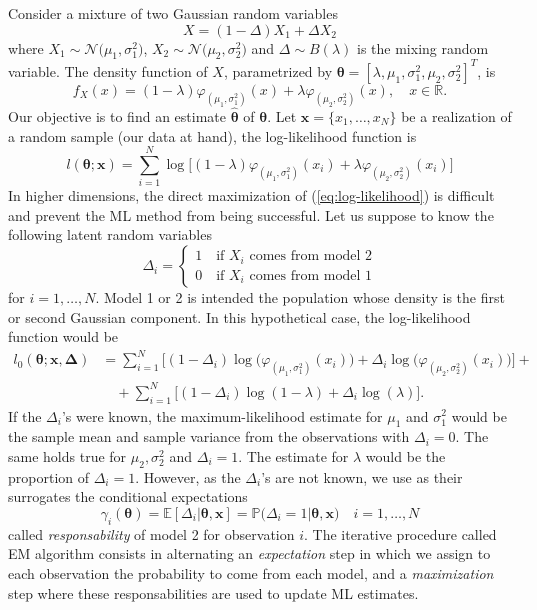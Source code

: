 Consider a mixture of two Gaussian random variables
\[X = (1-\Delta)X_1 + \Delta X_2 \] where $X_1 \sim \mathcal{N}\big(\mu_1,\sigma^2_1\big)$, $X_2 \sim \mathcal{N}\big(\mu_2,\sigma^2_2\big)$ and $\Delta \sim B(\lambda)$ is the mixing random variable. The density function of $X$, parametrized by $\bm{\theta} = [\lambda,\mu_1,\sigma^2_1,\mu_2,\sigma^2_2]^T$, is
\[f_X(x) = (1-\lambda)\varphi_{(\mu_1,\sigma^2_1)}(x)+\lambda \varphi_{(\mu_2,\sigma^2_2)}(x), \quad x \in \mathbb{R}. \] Our objective is to find an estimate $\widehat{\bm{\theta}}$ of $\bm{\theta}$. Let $\bm{x} = \{x_1,\ldots,x_N\}$ be a realization of a random sample (our data at hand), the log-likelihood function is
\begin{equation}\label{eq:log-likelihood}
l(\bm{\theta};\bm{x}) = \sum_{i=1}^{N}\log\big[(1-\lambda)\varphi_{(\mu_1,\sigma^2_1)}(x_i)+\lambda\varphi_{(\mu_2,\sigma^2_2)}(x_i) \big]
\end{equation}
In higher dimensions, the direct maximization of (\ref{eq:log-likelihood}) is difficult and prevent the ML method from being successful. Let us suppose to know the following latent random variables
\[ \Delta_i = 
\begin{cases*}
1 \quad  \text{if $X_i$ comes from model 2}\\
0 \quad \text{if $X_i$ comes from model 1}
\end{cases*}
\]
for $i = 1,\ldots,N$. Model 1 or 2 is intended the population whose density is the first or second Gaussian component. In this hypothetical case, the log-likelihood function would be 
\begin{align*}
l_0(\bm{\theta};\bm{x},\bm{\Delta}) & = \sum_{i=1}^{N}\big[(1-\Delta_i)\log\big(\varphi_{(\mu_1,\sigma^2_1)}(x_i)\big)+\Delta_i\log\big(\varphi_{(\mu_2,\sigma^2_2)}(x_i)\big)\big]+\\
& \quad + \sum_{i=1}^{N}\big[(1-\Delta_i)\log(1-\lambda)+\Delta_i \log(\lambda) \big].
\end{align*}
If the $\Delta_i$'s were known, the maximum-likelihood estimate for $\mu_1$ and $\sigma^2_1$ would be the sample mean and sample variance from the observations with $\Delta_i = 0$. The same holds true for $\mu_2,\sigma^2_2$ and $\Delta_i=1$. The estimate for $\lambda$ would be the proportion of $\Delta_i = 1$. However, as the 
$\Delta_i$'s are not known, we use as their surrogates the conditional expectations \[ \gamma_i(\bm{\theta}) = \mathbb{E}[\Delta_i \lvert \bm{\theta},\bm{x}]= \mathbb{P}\big(\Delta_i= 1 \lvert\bm{\theta},\bm{x} \big) \quad i = 1,\ldots,N \] called \textit{responsability} of model 2 for observation $i$. The iterative procedure called EM algorithm consists in alternating an \textit{expectation} step in which we assign to each observation the probability to come from each model, and a \textit{maximization} step where these responsabilities are used to update ML estimates.
